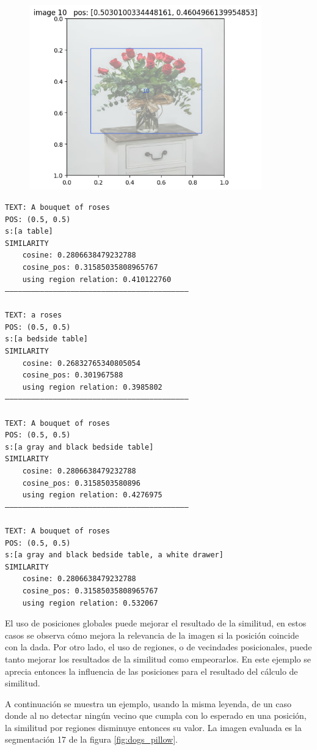 \begin{figure}[H]
\centering
 \includegraphics[height=80mm]{Graphics/vase_roses.jpg}
 \caption{ }
 \label{fig:roses}
\end{figure}

\begin{verbatim}
TEXT: A bouquet of roses
POS: (0.5, 0.5)
s:[a table]
SIMILARITY
    cosine: 0.2806638479232788
    cosine_pos: 0.31585035808965767
    using region relation: 0.410122760
——————————————————————————————————————————

TEXT: a roses
POS: (0.5, 0.5)
s:[a bedside table]
SIMILARITY
    cosine: 0.26832765340805054
    cosine_pos: 0.301967588
    using region relation: 0.3985802
——————————————————————————————————————————

TEXT: A bouquet of roses
POS: (0.5, 0.5)
s:[a gray and black bedside table]
SIMILARITY
    cosine: 0.2806638479232788
    cosine_pos: 0.3158503580896
    using region relation: 0.4276975
——————————————————————————————————————————

TEXT: A bouquet of roses
POS: (0.5, 0.5)
s:[a gray and black bedside table, a white drawer]
SIMILARITY
    cosine: 0.2806638479232788
    cosine_pos: 0.31585035808965767
    using region relation: 0.532067
\end{verbatim}
El uso de posiciones globales puede mejorar el resultado de la similitud, en estos casos se observa cómo mejora la relevancia de la imagen si la posición coincide con la dada. Por otro lado, el uso de regiones, o de vecindades posicionales, puede tanto mejorar los resultados de la similitud como empeorarlos. En este ejemplo se aprecia entonces la influencia de las posiciones para el resultado del c\'alculo de similitud.

A continuaci\'on se muestra un ejemplo, usando la misma leyenda, de un caso donde al no detectar ningún vecino que cumpla con lo esperado en una posición, la similitud por regiones disminuye entonces su valor. La imagen evaluada es la segmentación 17 de la figura \ref{fig:dogs_pillow}.

